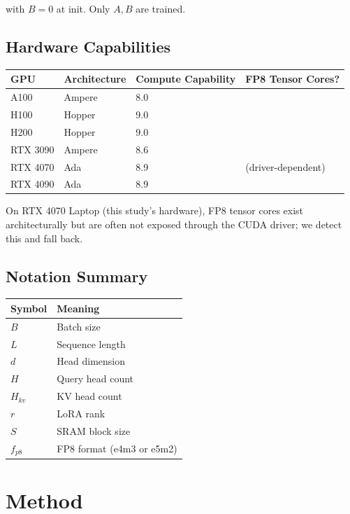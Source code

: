 with $B = 0$ at init. Only $A, B$ are trained.

\subsection{Hardware Capabilities}

\begin{table}[H]
\centering
\small
\begin{tabular}{llll}
\toprule
\textbf{GPU} & \textbf{Architecture} & \textbf{Compute Capability} & \textbf{FP8 Tensor Cores?} \\
\midrule
A100 & Ampere & 8.0 &  \\
H100 & Hopper & 9.0 &  \\
H200 & Hopper & 9.0 &  \\
RTX 3090 & Ampere & 8.6 &  \\
RTX 4070 & Ada & 8.9 & (driver-dependent) \\
RTX 4090 & Ada & 8.9 &  \\
\bottomrule
\end{tabular}
\end{table}

On RTX 4070 Laptop (this study's hardware), FP8 tensor cores exist 
architecturally but are often not exposed through the CUDA driver; we 
detect this and fall back.

\subsection{Notation Summary}

\begin{table}[H]
\centering
\small
\begin{tabular}{ll}
\toprule
\textbf{Symbol} & \textbf{Meaning} \\
\midrule
$B$ & Batch size \\
$L$ & Sequence length \\
$d$ & Head dimension \\
$H$ & Query head count \\
$H_{kv}$ & KV head count \\
$r$ & LoRA rank \\
$S$ & SRAM block size \\
$f_{p8}$ & FP8 format (e4m3 or e5m2) \\
\bottomrule
\end{tabular}
\end{table}




\section{Method}

